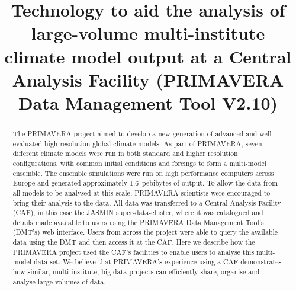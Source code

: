 \documentclass[gmd, manuscript]{copernicus}
\begin{document}
\title{Technology to aid the analysis of large-volume multi-institute climate model output at a Central Analysis Facility (PRIMAVERA Data Management Tool V2.10)}













\received{}
\pubdiscuss{} %
\revised{}
\accepted{}
\published{}




\maketitle



\begin{abstract}
The PRIMAVERA project aimed to develop a new generation of advanced and well-evaluated high-resolution global climate models. As part of PRIMAVERA, seven different climate models were run in both standard and higher resolution configurations, with common initial conditions and forcings to form a multi-model ensemble. The ensemble simulations were run on high performance computers across Europe and generated approximately 1.6~pebibytes of output. To allow the data from all models to be analysed at this scale, PRIMAVERA scientists were encouraged to bring their analysis to the data. All data was transferred to a Central Analysis Facility (CAF), in this case the JASMIN super-data-cluster, where it was catalogued and details made available to users using the PRIMAVERA Data Management Tool's (DMT's) web interface. Users from across the project were able to query the available data using the DMT and then access it at the CAF. Here we describe how the PRIMAVERA project used the CAF's facilities to enable users to analyse this multi-model data set. We believe that PRIMAVERA's experience using a CAF demonstrates how similar, multi institute, big-data projects can efficiently share, organise and analyse large volumes of data.
\end{abstract}
\end{document}
